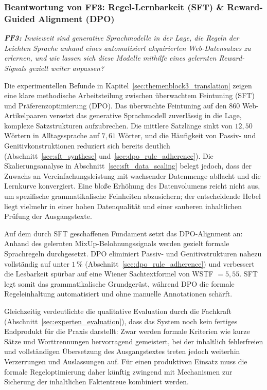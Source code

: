 \subsubsection{Beantwortung von FF3: Regel-Lernbarkeit (SFT) \& Reward-Guided Alignment (DPO)}

\begin{tcolorbox}[boxrule=0pt,sharp corners,enhanced,borderline west={2pt}{0pt}{blue}]
    \textit{\textbf{FF3:} Inwieweit sind generative Sprachmodelle in der Lage, die Regeln der Leichten Sprache anhand eines automatisiert akquirierten Web-Datensatzes zu erlernen, und wie lassen sich diese Modelle mithilfe eines gelernten Reward-Signals gezielt weiter anpassen?}
\end{tcolorbox}

Die experimentellen Befunde in Kapitel~\ref{sec:themenblock3_translation} zeigen eine klare methodische Arbeitsteilung zwischen überwachtem Feintuning (SFT) und Präferenzoptimierung (DPO). Das überwachte Feintuning auf den $860$ Web-Artikelpaaren versetzt das generative Sprachmodell zuverlässig in die Lage, komplexe Satzstrukturen aufzubrechen. Die mittlere Satzlänge sinkt von $12{,}50$ Wörtern in Alltagssprache auf $7{,}61$ Wörter, und die Häufigkeit von Passiv- und Genitivkonstruktionen reduziert sich bereits deutlich (Abschnitt~\ref{sec:sft_synthese} und~\ref{sec:dpo_rule_adherence}). Die Skalierungsanalyse in Abschnitt~\ref{sec:sft_data_scaling} belegt jedoch, dass der Zuwachs an Vereinfachungsleistung mit wachsender Datenmenge abflacht und die Lernkurve konvergiert. Eine bloße Erhöhung des Datenvolumens reicht nicht aus, um spezifische grammatikalische Feinheiten abzusichern; der entscheidende Hebel liegt vielmehr in einer hohen Datenqualität und einer sauberen inhaltlichen Prüfung der Ausgangstexte.

Auf dem durch SFT geschaffenen Fundament setzt das DPO-Alignment an: Anhand des gelernten MixUp-Belohnungssignals werden gezielt formale Sprachregeln durchgesetzt. DPO eliminiert Passiv- und Genitivstrukturen nahezu vollständig auf unter $1\,\%$ (Abschnitt~\ref{sec:dpo_rule_adherence}) und verbessert die Lesbarkeit spürbar auf eine Wiener Sachtextformel von WSTF $= 5{,}55$. SFT legt somit das grammatikalische Grundgerüst, während DPO die formale Regeleinhaltung automatisiert und ohne manuelle Annotationen schärft.

Gleichzeitig verdeutlichte die qualitative Evaluation durch die Fachkraft (Abschnitt~\ref{sec:experten_evaluation}), dass das System noch kein fertiges Endprodukt für die Praxis darstellt: Zwar werden formale Kriterien wie kurze Sätze und Worttrennungen hervorragend gemeistert, bei der inhaltlich fehlerfreien und vollständigen Übersetzung des Ausgangstextes treten jedoch weiterhin Verzerrungen und Auslassungen auf. Für einen produktiven Einsatz muss die formale Regeloptimierung daher künftig zwingend mit Mechanismen zur Sicherung der inhaltlichen Faktentreue kombiniert werden.

